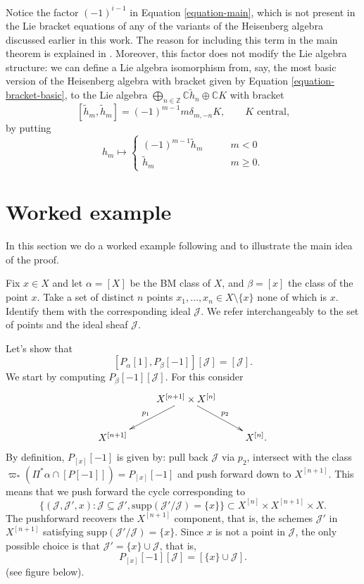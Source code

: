 \medskip\noindent
Notice the factor $(-1)^{i-1}$
in Equation \ref{equation-main},
which is not present in the Lie bracket
equations of any of the
variants of the Heisenberg algebra discussed
earlier in this work.
The reason for including this term in the
main theorem
is explained in
\cite[Theorem 9.15]{Nakajima-lectures}.
Moreover, this factor does not modify the
Lie algebra structure:
we can define a Lie algebra isomorphism
from, say, the most basic version of the
Heisenberg algebra
with bracket given by Equation
\ref{equation-bracket-basic},
to the Lie algebra
$\bigoplus_{n \in
\mathbb{Z}}\mathbb{C}\tilde{h}_n
\oplus\mathbb{C}K$
with bracket
$$
[\tilde{h}_m,\tilde{h}_m]=(-1)^{m-1}m\delta_{m,-n}K,\qquad
\text{$K$ central,}
$$
by putting
$$
h_m \mapsto
\begin{cases}
(-1)^{m-1}\tilde{h}_m\qquad &m<0 \\
\tilde{h}_m\qquad &m\geq 0.
\end{cases}
$$



\section{Worked example}
\label{section-example}

\noindent
In this section we do a worked example
following \cite{Nakajima-lectures}
and \cite[Video 10]{videos}
to illustrate the main idea of the proof.

\medskip\noindent
Fix $x \in X$ and let $\alpha=[X]$ be the BM
class of $X$,
and $\beta=[x]$ the class of the point $x$.
Take a set of distinct $n$ points
$x_1,\ldots,x_n \in X\setminus\{x\}$
none of which is $x$.
Identify them with the corresponding
ideal $\mathcal{J}$. We refer interchangeably
to the set of points and the ideal sheaf
$\mathcal{J}$.

Let's show that
$$
[P_\alpha[1],P_\beta[-1]][\mathcal{J}]=[\mathcal{J}].
$$
We start by computing
$P_\beta[-1][\mathcal{J}]$.
For this consider
$$
\xymatrix{
&X^{[n+1]}\times
X^{[n]}\ar[ld]_{p_1}\ar[rd]^{p_2}\\
X^{[n+1]}&&X^{[n]}.
}
$$
By definition, $P_{[x]}[-1]$ is given by:
pull back $\mathcal{J}$ via $p_2$,
intersect with the class
$\varpi_*(\Pi^*\alpha \cap
[P[-1]])=P_{[x]}[-1]$
and push forward
down to $X^{[n+1]}$.
This means that we push forward the cycle
corresponding to
$$
\{(\mathcal{J}, \mathcal{J}',x)
:\mathcal{J}\subseteq
\mathcal{J}',\text{supp}(\mathcal{J}'/\mathcal{J})=\{x\}\}
\subset X^{[n]} \times X^{[n+1]} \times X.
$$
The pushforward recovers the $X^{[n+1]}$
component,
that is, the schemes $\mathcal{J}'$ in
$X^{[n+1]}$ satisfying
$\text{supp}(\mathcal{J}'/\mathcal{J})=\{x\}$.
Since $x$ is not a point in $\mathcal{J}$,
the only possible choice is that
$\mathcal{J}'=\{x\}\cup \mathcal{J}$,
that is,
$$
P_{[x]}[-1][\mathcal{J}]=[\{x\}\cup
\mathcal{J}].
$$
(see figure below).


